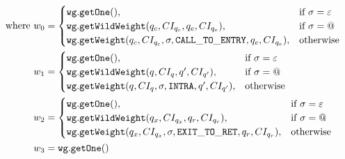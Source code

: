 \begin{align*}
\text{where }
w_0 &= \begin{cases}
           \mathtt{wg.getOne}(), & \text{if } \sigma = \varepsilon \\
           \mathtt{wg.getWildWeight}(q_c,CI_{q_c},q_e,CI_{q_e}), & \text{if } \sigma = \text{\ensuremath{@}} \\
           \mathtt{wg.getWeight}(q_c,CI_{q_c},\sigma, \mathtt{CALL\_TO\_ENTRY},q_e,CI_{q_e}), & \text{otherwise}
      \end{cases} \\
w_1 &= \begin{cases}
           \mathtt{wg.getOne}(), & \text{if } \sigma = \varepsilon \\
           \mathtt{wg.getWildWeight}(q,CI_q,q',CI_{q'}), & \text{if } \sigma = \text{\ensuremath{@}} \\
           \mathtt{wg.getWeight}(q,CI_q,\sigma, \mathtt{INTRA},q',CI_{q'}), & \text{otherwise}
       \end{cases} \\
w_2 &= \begin{cases}
          \mathtt{wg.getOne}(), & \text{if } \sigma = \varepsilon \\
          \mathtt{wg.getWildWeight}(q_x,CI_{q_x},q_r,CI_{q_r}), & \text{if } \sigma = \text{\ensuremath{@}} \\
          \mathtt{wg.getWeight}(q_x,CI_{q_x},\sigma, \mathtt{EXIT\_TO\_RET},q_r,CI_{q_r}), & \text{otherwise}
      \end{cases} \\
w_3 &= \mathtt{wg.getOne}()
\end{align*}


